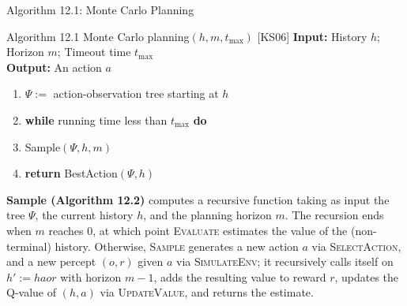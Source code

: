 \documentclass[aspectratio=169,10pt]{beamer}
\begin{document}
\begin{frame}{Algorithm 12.1: Monte Carlo Planning}
\begin{block}{Algorithm 12.1 Monte Carlo planning$(h,m,t_{\max})$ [KS06]}
\textbf{Input:} History $h$; Horizon $m$; Timeout time $t_{\max}$\\
\textbf{Output:} An action $a$
\begin{enumerate}
\setcounter{enumi}{0}
\item[1:] $\Psi:=$ action-observation tree starting at $h$
\item[2:] \textbf{while} running time less than $t_{\max}$ \textbf{do}
\item[3:] \quad Sample$(\Psi,h,m)$
\item[4:] \textbf{return} BestAction$(\Psi,h)$
\end{enumerate}
\end{block}
\vspace{0.3cm}
\textbf{Sample (Algorithm 12.2)} computes a recursive function taking as input the tree
$\Psi$, the current history $h$, and the planning horizon $m$. The recursion ends when $m$
reaches $0$, at which point \textsc{Evaluate} estimates the value of the (non-terminal)
history. Otherwise, \textsc{Sample} generates a new action $a$ via \textsc{SelectAction},
and a new percept $(o,r)$ given $a$ via \textsc{SimulateEnv}; it recursively calls itself
on $h':=haor$ with horizon $m-1$, adds the resulting value to reward $r$, updates the
Q-value of $(h,a)$ via \textsc{UpdateValue}, and returns the estimate.
\end{frame}
\end{document}
